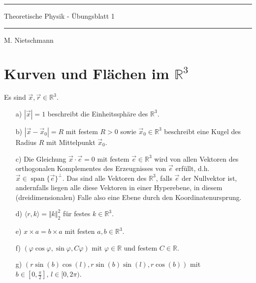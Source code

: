 \documentclass[11pt]{article}
\theoremstyle{plain}
\theoremstyle{definition}
\theoremstyle{remark}
\newcommand{\R}{\mathbb{R}}
\newcommand{\ph}{\varphi}
\begin{document}
\pagestyle{fancy}
\thispagestyle{plain}

\rule{\textwidth}{.5pt}
\begin{center}
\Huge{Theoretische Physik - Übungsblatt 1}
\end{center}

\rule{\textwidth}{.5pt}
\text{} \hfill M. Nietschmann 




\section{Kurven und Flächen im $ \R^3 $} 

Es sind $ \vec{x},\vec{r} \in \R^3 $. 
\begin{itemize}
\item[a)] 
$ | \vec{x} | = 1 $ beschreibt die Einheitssphäre des $ \R^3 $. 

\item[b)] 
$ | \vec{x} - \vec{x}_0 | = R $ mit festem $ R > 0 $ sowie $ \vec{x}_0 \in \R^3 $ beschreibt eine Kugel des Radius $ R $ mit Mittelpunkt $ \vec{x}_0 $. 

\item[c)] 
Die Gleichung $ \vec{x} \cdot \vec{e} = 0 $ mit festem $ \vec{e} \in \R^3 $ 
wird von allen Vektoren des orthogonalen Komplementes des Erzeugnisses von $ \vec{e} $ erfüllt, d.h. $ \vec{x} \in \operatorname{span} \{ \vec{e} \}^\perp $. 
Das sind alle Vektoren des $ \R^3 $, falls $ \vec{e} $ der Nullvektor ist, andernfalls liegen alle diese Vektoren in einer Hyperebene, in diesem (dreidimensionalen) Falle also eine Ebene durch den Koordinatenursprung. 

\item[d)] $\langle r, k \rangle = \Vert k \Vert_2^2$ für festes $k \in \R^3$.

\item[e)] $x \times a = b \times a$ mit festen $a, b \in \R^3$.

\item[f)] $(\ph \cos\ph, \sin\ph, C\ph)$ mit $\ph \in \R$ und festem $C \in \R$.

\item[g)] $(r\sin(b) \cos(l), r \sin(b) \sin(l), r \cos(b))$ mit $b \in [0, \frac{\pi}{2}], \, l \in [0, 2\pi)$.

\end{itemize}
\end{document}
